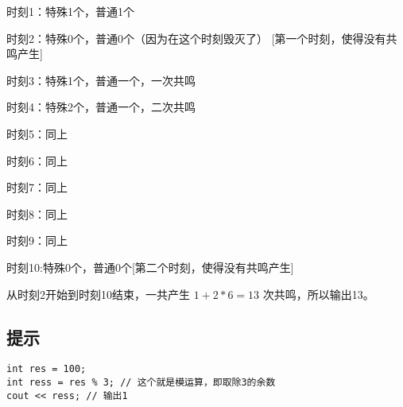时刻1：特殊1个，普通1个

时刻2：特殊0个，普通0个（因为在这个时刻毁灭了） [第一个时刻，使得没有共鸣产生]

时刻3：特殊1个，普通一个，一次共鸣

时刻4：特殊2个，普通一个，二次共鸣

时刻5：同上

时刻6：同上

时刻7：同上

时刻8：同上

时刻9：同上

时刻10:特殊0个，普通0个[第二个时刻，使得没有共鸣产生]

从时刻2开始到时刻10结束，一共产生 $1+2*6=13$ 次共鸣，所以输出13。

\subsection*{提示}

\begin{lstlisting}
int res = 100;
int ress = res % 3; // 这个就是模运算，即取除3的余数
cout << ress; // 输出1
\end{lstlisting}